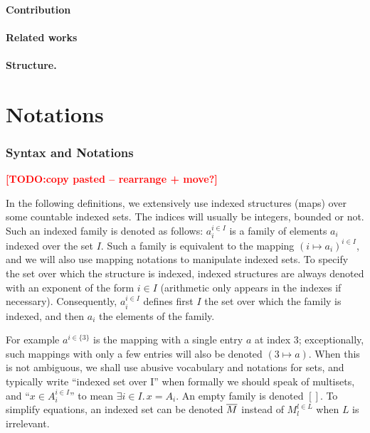 \documentclass{lncs/llncs}
\newcommand{\TODO}[1]{\textcolor{red}{\textbf{[TODO:#1]}}}
\begin{document}
\paragraph{Contribution}

\paragraph{Related works}



\paragraph{Structure.}


\section{Notations}

\subsubsection{Syntax and Notations}
\TODO{copy pasted -- rearrange + move?}

In the following definitions, we extensively use indexed structures
(maps) over some countable indexed sets. The indices will usually be
integers, bounded or not. Such an indexed family is denoted as
follows: $a_i^{i\in I}$ is a family of elements $a_i$ indexed over the
set $I$. Such a family
is equivalent to the mapping $(i\mapsto a_i)^{i\in I}$, and we will also use mapping 
notations to manipulate indexed sets.
To specify the set over which the structure is indexed, 
indexed structures are always denoted with an exponent of the form $i\in I$
(arithmetic only appears in the indexes if necessary).
Consequently, $a_i^{i\in I}$ defines first $I$ the set over which the
family is indexed, and then $a_i$ the elements of the family.

For example $a^{i\in\{3\}}$ is
the mapping with a single entry $a$ at index $3$; exceptionally, such mappings with
only a few entries will also be denoted $(3\mapsto a)$.
When this is not ambiguous, we shall use abusive vocabulary and
notations for sets, and typically write ``indexed set over I'' when  
formally we should speak of multisets, and ``$x\in
A_i^{i\in I}$'' to mean $\exists i\in I.\, x=A_i$.
An empty family is denoted $[]$. %
To simplify equations, an indexed set can be denoted $\overline{M}$
instead of $M_l^{l\in L}$ when $L$ is irrelevant.
\end{document}
